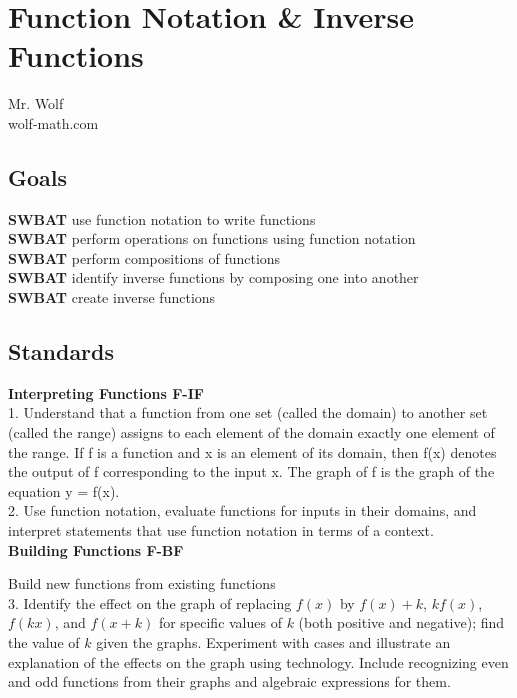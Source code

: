 \documentclass[12pt]{article}
\let\stdsection\section
\renewcommand\section{\newpage\stdsection}
\begin{document}
\newcommand{\random}{\rand\arabic{rand}}

\tableofcontents

\section{Function Notation \& Inverse Functions}


Mr. Wolf \\ wolf-math.com

\subsection{Goals}

\textbf{SWBAT} use function notation to write functions\\

\textbf{SWBAT} perform operations on functions using function notation\\

\textbf{SWBAT} perform compositions of functions\\

\textbf{SWBAT} identify inverse functions by composing one into another\\

\textbf{SWBAT} create inverse functions


\subsection{Standards}

\textbf{Interpreting Functions \hfill F-IF}\\

1. Understand that a function from one set (called the domain) to
another set (called the range) assigns to each element of the domain
exactly one element of the range. If f is a function and x is an element
of its domain, then f(x) denotes the output of f corresponding to the
input x. The graph of f is the graph of the equation y = f(x).\\

2. Use function notation, evaluate functions for inputs in their domains,
and interpret statements that use function notation in terms of a
context.\\

\textbf{Building Functions \hfill F-BF}

Build new functions from existing functions\\

3. Identify the effect on the graph of replacing $f(x)$ by $f(x) + k$, $k f(x)$,
$f(kx)$, and $f(x + k)$ for specific values of $k$ (both positive and negative);
find the value of $k$ given the graphs. Experiment with cases and
illustrate an explanation of the effects on the graph using technology.
Include recognizing even and odd functions from their graphs and
algebraic expressions for them.\\
\end{document}
